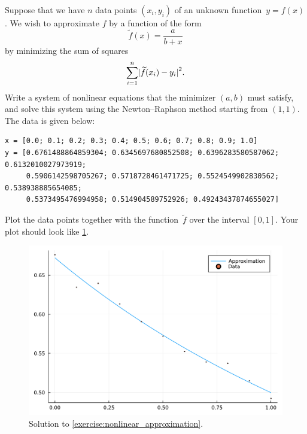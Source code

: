 \begin{exercise}
    \label{exercise:nonlinear_approximation}
    Suppose that we have $n$ data points $(x_i, y_i)$ of an unknown function~$y = f(x)$.
    We wish to approximate $f$ by a function of the form
    \[
        \widetilde f(x) = \frac{a}{b + x}
    \]
    by minimizing the sum of squares
    \[
        \sum_{i=1}^{n} \abs[big]{\widetilde f(x_i) - y_i}^2.
    \]
    Write a system of nonlinear equations that the minimizer $(a, b)$ must satisfy,
    and solve this system using the Newton--Raphson method starting from $(1, 1)$.
    The data is given below:
    \begin{verbatim}
x = [0.0; 0.1; 0.2; 0.3; 0.4; 0.5; 0.6; 0.7; 0.8; 0.9; 1.0]
y = [0.6761488864859304; 0.6345697680852508; 0.6396283580587062; 0.6132010027973919;
     0.5906142598705267; 0.5718728461471725; 0.5524549902830562; 0.538938885654085;
     0.5373495476994958; 0.514904589752926; 0.49243437874655027]
    \end{verbatim}
    Plot the data points together with the function~$\widetilde f$ over the interval $[0, 1]$.
    Your plot should look like \cref{fig:solution_exercise_approximation}.
    \begin{figure}[ht]
        \centering
        \includegraphics[width=0.6\linewidth]{figures/approx.pdf}
        \caption{Solution to \cref{exercise:nonlinear_approximation}.}%
        \label{fig:solution_exercise_approximation}
    \end{figure}
\end{exercise}

